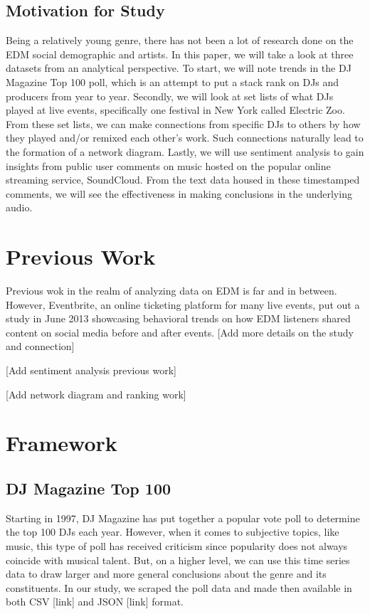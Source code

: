 \documentclass[12pt]{dalcsthesis}
\begin{document}
\section{Motivation for Study}

Being a relatively young genre, there has not been a lot of research done on the EDM social demographic and artists. In this paper, we will take a look at three datasets from an analytical perspective. To start, we will note trends in the DJ Magazine Top 100 poll, which is an attempt to put a stack rank on DJs and producers from year to year. Secondly, we will look at set lists of what DJs played at live events, specifically one festival in New York called Electric Zoo. From these set lists, we can make connections from specific DJs to others by how they played and/or remixed each other's work. Such connections naturally lead to the formation of a network diagram. Lastly, we will use sentiment analysis to gain insights from public user comments on music hosted on the popular online streaming service, SoundCloud. From the text data housed in these timestamped comments, we will see the effectiveness in making conclusions in the underlying audio.

\chapter{Previous Work}

Previous wok in the realm of analyzing data on EDM is far and in between. However, Eventbrite, an online ticketing platform for many live events, put out a study in June 2013 showcasing behavioral trends on how EDM listeners shared content on social media before and after events. [Add more details on the study and connection]

[Add sentiment analysis previous work]

[Add network diagram and ranking work]

\chapter{Framework}

\section{DJ Magazine Top 100}

Starting in 1997, DJ Magazine has put together a popular vote poll to determine the top 100 DJs each year. However, when it comes to subjective topics, like music, this type of poll has received criticism since popularity does not always coincide with musical talent. But, on a higher level, we can use this time series data to draw larger and more general conclusions about the genre and its constituents. In our study, we scraped the poll data and made then available in both CSV [link] and JSON [link] format. 
\end{document}
